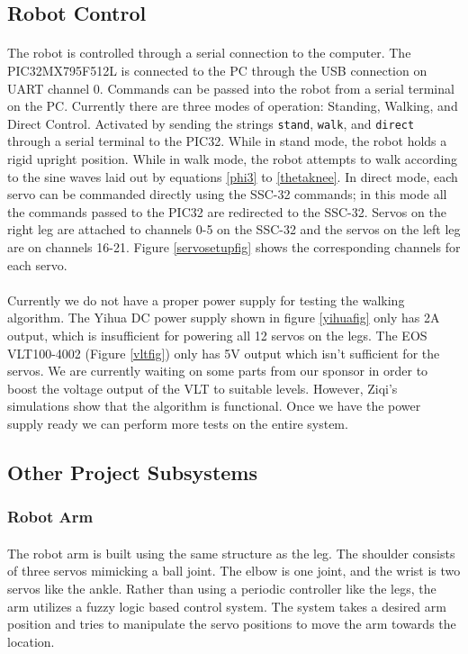 \documentclass[titlepage,letterpaper,12pt]{article}
\begin{document}
\subsection{Robot Control}
\paragraph{}The robot is controlled through a serial connection to the computer.
The PIC32MX795F512L is connected to the PC through the USB connection on UART
channel 0. Commands can be passed into the robot from a serial terminal on the
PC. Currently there are three modes of operation: Standing, Walking, and Direct
Control. Activated by sending the strings \verb!stand!, \verb!walk!, and
\verb!direct! through a serial terminal to the PIC32. While in stand mode, the
robot holds a rigid upright position. While in walk mode, the robot attempts to
walk according to the sine waves laid out by equations \ref{phi3} to
\ref{thetaknee}. In direct mode, each servo can be commanded directly using
the SSC-32 commands; in this mode all the commands passed to the PIC32 are
redirected to the SSC-32. Servos on the right leg are attached to channels 0-5
on the SSC-32 and the servos on the left leg are on channels 16-21. Figure
\ref{servosetupfig} shows the corresponding channels for each servo.

\paragraph{}Currently we do not have a proper power supply for testing the
walking algorithm. The Yihua DC power supply shown in figure \ref{yihuafig} only
has 2A output, which is insufficient for powering all 12 servos on the legs. The
EOS VLT100-4002 (Figure \ref{vltfig}) only has 5V output which isn't sufficient
for the servos. We are currently waiting on some parts from our sponsor in order
to boost the voltage output of the VLT to suitable levels. However, Ziqi's
simulations show that the algorithm is functional. Once we have the power supply
ready we can perform more tests on the entire system.

\subsection{Other Project Subsystems}
\subsubsection{Robot Arm}
\paragraph{}The robot arm is built using the same structure as the leg. The
shoulder consists of three servos mimicking a ball joint. The elbow is one
joint, and the wrist is two servos like the ankle. Rather than using a periodic
controller like the legs, the arm utilizes a fuzzy logic based control system.
The system takes a desired arm position and tries to manipulate the servo
positions to move the arm towards the location.
\end{document}
